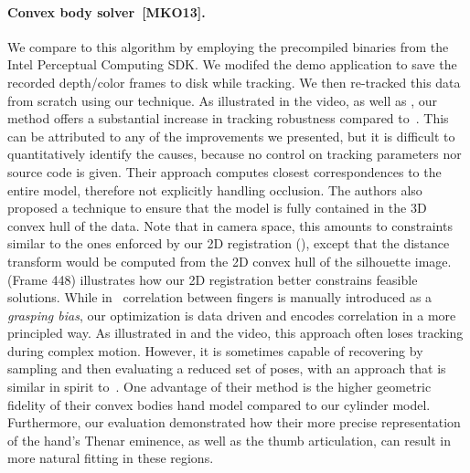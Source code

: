 



\paragraph*{Convex body solver~[MKO13].}

We compare to this algorithm by employing the precompiled binaries from the Intel Perceptual Computing SDK. We modifed the demo application to save the recorded depth/color frames to disk while tracking. We then re-tracked this data from scratch using our technique. As illustrated in the video, as well as , our method offers a substantial increase in tracking  robustness compared to~\cite{melax_13}. 
% 
This can be attributed to any of the improvements we presented, but it is difficult to quantitatively identify the causes, because no control on tracking parameters nor source code is given. 
% 
Their approach computes closest correspondences to the entire model, therefore not explicitly handling occlusion. 
%
The authors also proposed a technique to ensure that the model is fully contained in the 3D convex hull of the data. Note that in camera space, this amounts to constraints similar to the ones enforced by our 2D registration (), except that the distance transform would be computed from the 2D convex hull of the silhouette image.  (Frame 448) illustrates how our 2D registration better constrains feasible solutions. 
% 
While in~\cite{melax_13} correlation between fingers is manually introduced as a \emph{grasping bias}, our optimization is data driven and encodes correlation in a more principled way. As illustrated in  and the video, this approach often loses tracking during complex motion. However, it is sometimes capable of recovering by sampling and then evaluating a reduced set of poses, with an approach that is similar in spirit to~\cite{oiko_bmvc11}.
% 
One advantage of their method is the higher geometric fidelity of their convex bodies hand model compared to our cylinder model. Furthermore, our evaluation demonstrated how their more precise representation of the hand's Thenar eminence, as well as the thumb articulation, can result in more natural fitting in these regions.


